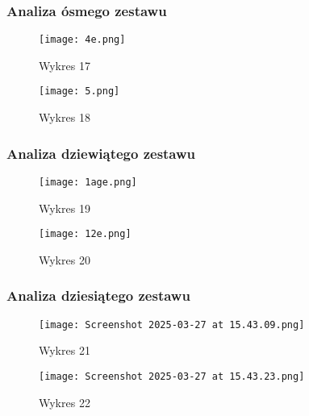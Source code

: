 \documentclass{article}
\begin{document}
\subsubsection{Analiza ósmego zestawu}
\begin{figure}[H]
    \centering
    \begin{minipage}{0.45\textwidth}
        \texttt{[image: 4e.png]}
        \caption{Wykres 17}
    \end{minipage}
    \hfill
    \begin{minipage}{0.45\textwidth}
        \texttt{[image: 5.png]}
        \caption{Wykres 18}
    \end{minipage}
\end{figure}

\subsubsection{Analiza dziewiątego zestawu}
\begin{figure}[H]
    \centering
    \begin{minipage}{0.45\textwidth}
        \texttt{[image: 1age.png]}
        \caption{Wykres 19}
    \end{minipage}
    \hfill
    \begin{minipage}{0.45\textwidth}
        \texttt{[image: 12e.png]}
        \caption{Wykres 20}
    \end{minipage}
\end{figure}

\subsubsection{Analiza dziesiątego zestawu}
\begin{figure}[H]
    \centering
    \begin{minipage}{0.45\textwidth}
        \texttt{[image: Screenshot 2025-03-27 at 15.43.09.png]}
        \caption{Wykres 21}
    \end{minipage}
    \hfill
    \begin{minipage}{0.45\textwidth}
        \texttt{[image: Screenshot 2025-03-27 at 15.43.23.png]}
        \caption{Wykres 22}
    \end{minipage}
\end{figure}
\end{document}
